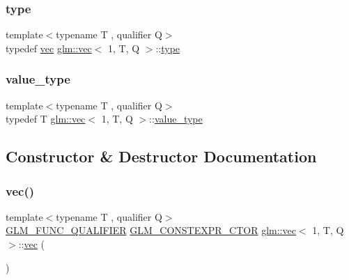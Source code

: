 \subsubsection{\texorpdfstring{type}{type}}
{\footnotesize\ttfamily template$<$typename T , qualifier Q$>$ \\
typedef \hyperlink{structglm_1_1vec}{vec} \hyperlink{structglm_1_1vec}{glm\+::vec}$<$ 1, T, Q $>$\+::\hyperlink{structglm_1_1vec_3_011_00_01_t_00_01_q_01_4_acc52e9f1fce6c99322df114842a855dd}{type}}

\mbox{\label{structglm_1_1vec_3_011_00_01_t_00_01_q_01_4_a0d473625a844d6df09585a2a2eed637c}} 
\subsubsection{\texorpdfstring{value\+\_\+type}{value\_type}}
{\footnotesize\ttfamily template$<$typename T , qualifier Q$>$ \\
typedef T \hyperlink{structglm_1_1vec}{glm\+::vec}$<$ 1, T, Q $>$\+::\hyperlink{structglm_1_1vec_3_011_00_01_t_00_01_q_01_4_a0d473625a844d6df09585a2a2eed637c}{value\+\_\+type}}



\subsection{Constructor \& Destructor Documentation}
\mbox{\label{structglm_1_1vec_3_011_00_01_t_00_01_q_01_4_a4fda39784b2ba699a88c6a4c2b94fc7b}} 
\subsubsection{\texorpdfstring{vec()}{vec()}\hspace{0.1cm}{\footnotesize\ttfamily [1/14]}}
{\footnotesize\ttfamily template$<$typename T , qualifier Q$>$ \\
\hyperlink{setup_8hpp_a33fdea6f91c5f834105f7415e2a64407}{G\+L\+M\+\_\+\+F\+U\+N\+C\+\_\+\+Q\+U\+A\+L\+I\+F\+I\+ER} \hyperlink{setup_8hpp_ad34178a09666081abdb573c14d1f4a5a}{G\+L\+M\+\_\+\+C\+O\+N\+S\+T\+E\+X\+P\+R\+\_\+\+C\+T\+OR} \hyperlink{structglm_1_1vec}{glm\+::vec}$<$ 1, T, Q $>$\+::\hyperlink{structglm_1_1vec}{vec} (\begin{DoxyParamCaption}{ }\end{DoxyParamCaption})}

